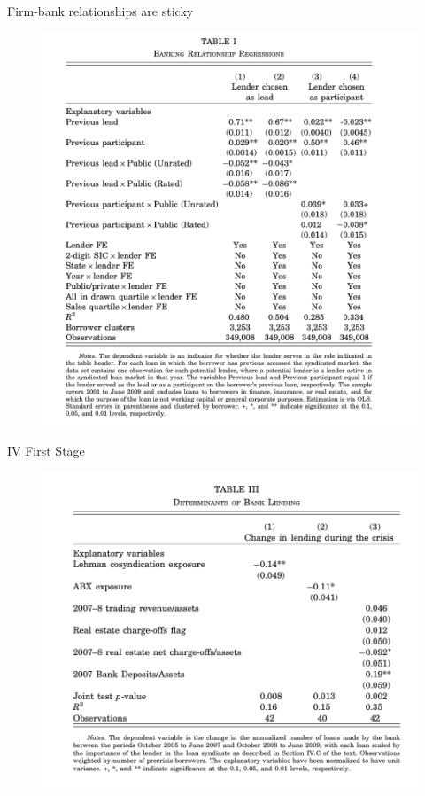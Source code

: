 \documentclass[english,xcolor=svgnames]{beamer}
\begin{document}
\begin{frame}{Firm-bank relationships are sticky}
\begin{figure}
\includegraphics[scale=0.45]{figures/cr_1}
\end{figure}
\end{frame}

\begin{frame}{IV First Stage}
\begin{figure}
\includegraphics[scale=0.45]{figures/cr_2}
\end{figure}
\end{frame}
\end{document}
